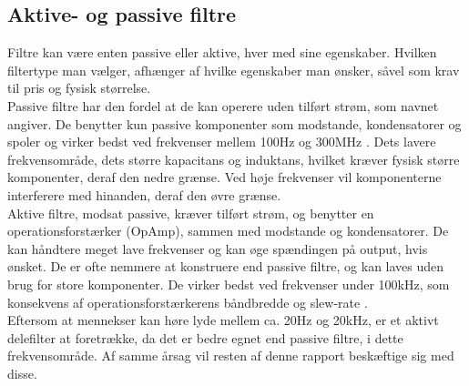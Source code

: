 \subsection{Aktive- og passive filtre}
\label{Aktive- og passive filtre}
Filtre kan være enten passive eller aktive, hver med sine egenskaber. Hvilken filtertype man vælger, afhænger af hvilke egenskaber man ønsker, såvel som krav til pris og fysisk størrelse.\\
Passive filtre har den fordel at de kan operere uden tilført strøm, som navnet angiver. De benytter kun passive komponenter som modstande, kondensatorer og spoler og virker bedst ved frekvenser mellem 100Hz og 300MHz \parencite{BOOK:PracticalElectronicsforInventors}. Dets lavere frekvensområde, dets større kapacitans og induktans, hvilket kræver fysisk større komponenter, deraf den nedre grænse. Ved høje frekvenser vil komponenterne interferere med hinanden, deraf den øvre grænse.\\
Aktive filtre, modsat passive, kræver tilført strøm, og benytter en operationsforstærker (OpAmp), sammen med modstande og kondensatorer. De kan håndtere meget lave frekvenser og kan øge spændingen på output, hvis ønsket. De er ofte nemmere at konstruere end passive filtre, og kan laves uden brug for store komponenter. De virker bedst ved frekvenser under 100kHz, som konsekvens af operationsforstærkerens båndbredde og slew-rate .\\
Eftersom at mennekser kan høre lyde mellem ca. 20Hz og 20kHz, er et aktivt delefilter at foretrække, da det er bedre egnet end passive filtre, i dette frekvensområde. Af samme årsag vil resten af denne rapport beskæftige sig med disse.
%
%
%
